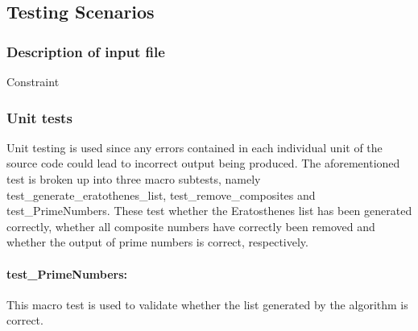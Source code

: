 \documentclass[]{article}
\begin{document}
\subsection{Testing Scenarios}

\subsubsection{Description of input file}


Constraint 

\subsubsection{Unit tests}

Unit testing is used since any errors contained in each individual unit of the source code could lead to incorrect output being produced. The aforementioned test is broken up into three macro subtests, namely test\_generate\_eratothenes\_list, test\_remove\_composites and test\_PrimeNumbers. These test whether the Eratosthenes list has been generated correctly, whether all composite numbers have correctly been removed and whether the output of prime numbers is correct, respectively. 


\paragraph{test\_PrimeNumbers:}

This macro test is used to validate whether the list generated by the algorithm is correct.
\end{document}
